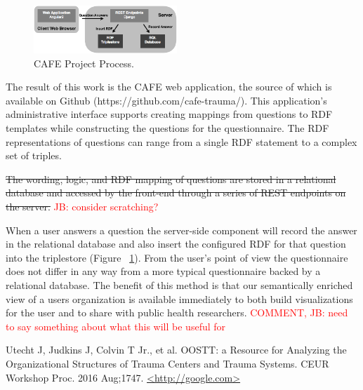 \documentclass{amia}
\begin{document}
\begin{figure}
  \begin{center}
    \includegraphics[width=0.48\textwidth]{pics/cafe_process2.png}
  \end{center}
  \caption{CAFE Project Process.}
  \label{cafe_process}
\end{figure}

The result of this work is the CAFE web application, the source of which is available on Github (https://github.com/cafe-trauma/). 
This application's administrative interface supports creating mappings from questions to RDF templates while constructing the questions for the questionnaire. The RDF representations of questions can range from a single RDF statement to a complex set of triples.

\sout {The wording, logic, and RDF mapping of questions are stored in a relational database and accessed by the front-end through a series of REST endpoints on the server.}
\textcolor{red}{JB: consider scratching?}

When a user answers a question the server-side component will record the answer in the relational database and also insert the configured RDF for that question into the triplestore (Figure ~\ref{cafe_process}).
From the user's point of view the questionnaire does not differ in any way from a more typical questionnaire backed by a relational database.
The benefit of this method is that our semantically enriched view of a users organization is available immediately to both build visualizations for the user and to share with public health researchers.
\textcolor{red}{COMMENT, JB: need to say something about what this will be useful for}


\makeatletter
\renewcommand{\@biblabel}[1]{\hfill #1.}
\makeatother


\begin{thebibliography}{1}
\setlength\itemsep{-0.1em}

Utecht J, Judkins J, Colvin T Jr., et al. OOSTT: a Resource for Analyzing the Organizational Structures of Trauma Centers and Trauma Systems. CEUR Workshop Proc. 2016 Aug;1747. \url{<http://google.com>}

\end{thebibliography}
\end{document}

